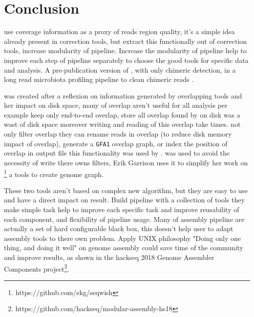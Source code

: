 \documentclass[main.tex]{subfiles}
\begin{document}
\chapter{Conclusion}



\bigskip

\yacrd use coverage information as a proxy of reads region quality, it's a simple idea already present in correction tools, but extract this functionally out of correction tools, increase modularity of pipeline. Increase the modularity of pipeline help to improve each step of pipeline separately to choose the good tools for specific data and analysis. A pre-publication version of \yacrd, with only chimeric detection, in a long read microbiota profiling pipeline to clean chimeric reads \cite{cite_yacrd}.

\fpa was created after a reflexion on information generated by overlapping tools and her impact on disk space, many of overlap aren't useful for all analysis per example \miniasm keep only end-to-end overlap, store all overlap found by \minimap on disk was a wast of disk space moreover writing and reading of this overlap take times. \fpa not only filter overlap they can rename reads in overlap (to reduce disk memory impact of overlap), generate a \texttt{GFA1} overlap graph, or index the position of overlap in output file this functionality was used by \consent \cite{CONSENT}. \fpa was used to avoid the necessity of write there owns filters, Erik Garrison uses it to simplify her work on \footnote{https://github.com/ekg/seqwish} a tools to create genome graph.

These two tools aren't based on complex new algorithm, but they are easy to use and have a direct impact on result. Build pipeline with a collection of tools they make simple task help to improve each specific task and improve reusability of each component, and flexibility of pipeline usage. Many of assembly pipeline are actually a set of hard configurable black box, this doesn't help user to adapt assembly tools to there own problem. Apply UNIX philosophy "Doing only one thing, and doing it well" on genome assembly could save time of the community and improve results, as shown in the hackseq 2018 Genome Assembler Components project\footnote{https://github.com/hackseq/modular-assembly-hs18}. 
\end{document}
